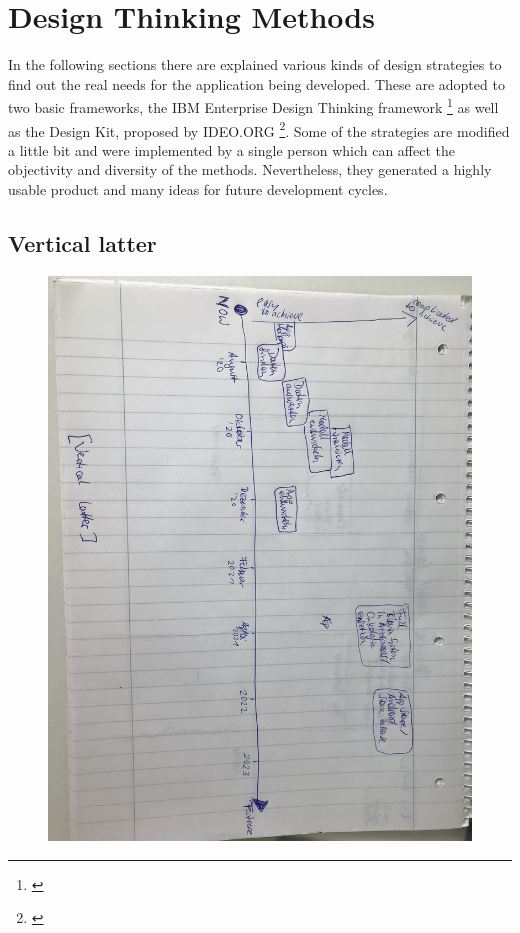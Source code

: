 \section{Design Thinking Methods}

In the following sections there are explained various kinds of design strategies to find out the real needs for the application being developed. These are adopted to two basic frameworks, the IBM Enterprise Design Thinking framework \footnote{\cite{ibm_edt}} as well as the Design Kit, proposed by IDEO.ORG \footnote{\cite{design_kit}}. Some of the strategies are modified a little bit and were implemented by a single person which can affect the objectivity and diversity of the methods. Nevertheless, they generated a highly usable product and many ideas for future development cycles. 

\subsection{Vertical latter}

\begin{figure}[h]
\includegraphics[scale=0.55, natwidth=1024, natheight=200]{images/verticallatter.jpg}
\end{figure}

